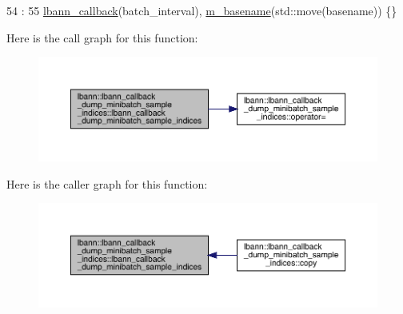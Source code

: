 \begin{DoxyCode}
54                                                                                            :
55     \hyperlink{classlbann_1_1lbann__callback_a679057298a41ddd47f08c157f756c584}{lbann\_callback}(batch\_interval), \hyperlink{classlbann_1_1lbann__callback__dump__minibatch__sample__indices_a75ef9a964cb1e1281e4721beef14c265}{m\_basename}(std::move(basename)) \{\}
\end{DoxyCode}
Here is the call graph for this function\+:\nopagebreak
\begin{figure}[H]
\begin{center}
\leavevmode
\includegraphics[width=350pt]{classlbann_1_1lbann__callback__dump__minibatch__sample__indices_a32e575722f9ad6f5a48a3fad20282075_cgraph}
\end{center}
\end{figure}
Here is the caller graph for this function\+:\nopagebreak
\begin{figure}[H]
\begin{center}
\leavevmode
\includegraphics[width=350pt]{classlbann_1_1lbann__callback__dump__minibatch__sample__indices_a32e575722f9ad6f5a48a3fad20282075_icgraph}
\end{center}
\end{figure}
\mbox{\label{classlbann_1_1lbann__callback__dump__minibatch__sample__indices_a11251f7788b1f167143e98647c93d80c}} 
